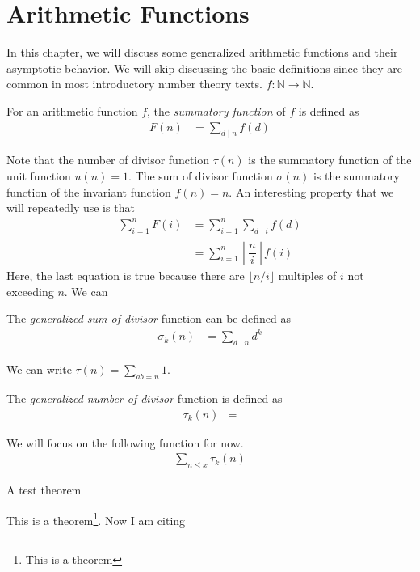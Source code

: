 \documentclass[elemannt.tex]{subfile}
\begin{document}
	\chapter{Arithmetic Functions}
	In this chapter, we will discuss some generalized arithmetic functions and their asymptotic behavior. We will skip discussing the basic definitions since they are common in most introductory number theory texts. $f:\mathbb{N}\to\mathbb{N}$.
		\begin{definition}
			For an arithmetic function $f$, the \textit{summatory function} of $f$ is defined as
				\begin{align*}
					F(n)
						& = \sum_{d\mid n}f(d)
				\end{align*}
		\end{definition}
	Note that the number of divisor function $\tau(n)$ is the summatory function of the unit function $u(n)=1$. The sum of divisor function $\sigma(n)$ is the summatory function of the invariant function $f(n)=n$. An interesting property that we will repeatedly use is that
		\begin{align*}
			\sum_{i=1}^{n}F(i)
				& = \sum_{i=1}^{n}\sum_{d\mid i}f(d)\\
				& = \sum_{i=1}^{n}\left\lfloor{\dfrac{n}{i}}\right\rfloor f(i)
		\end{align*}
	Here, the last equation is true because there are $\lfloor{n/i}\rfloor$ multiples of $i$ not exceeding $n$. We can 
		\begin{definition}
			The \textit{generalized sum of divisor} function can be defined as
				\begin{align*}
					\sigma_{k}(n)
					& = \sum_{d\mid n}d^{k}
			\end{align*}
		\end{definition}
	We can write $\tau(n)=\sum_{ab=n}1$.
		\begin{definition}
			The \textit{generalized number of divisor} function is defined as
				\begin{align*}
					\tau_{k}(n)
						& = 
				\end{align*}
		\end{definition}
	We will focus on the following function for now.
		\begin{align*}
			\sum_{n\leq x}\tau_{k}(n)
		\end{align*}
	
		\begin{theorem}
			A test theorem
		\end{theorem}
	
	This is a theorem\footnote{This is a theorem}. Now I am citing \textcite{apostol_1976}
\end{document}
